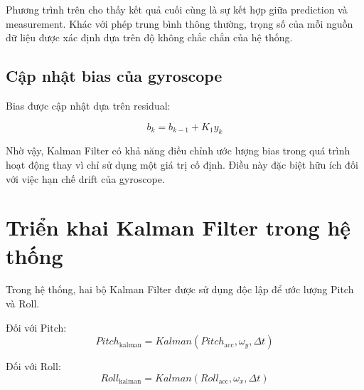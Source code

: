Phương trình trên cho thấy kết quả cuối cùng là sự kết hợp giữa prediction và measurement. Khác với phép trung bình thông thường, trọng số của mỗi nguồn dữ liệu được xác định dựa trên độ không chắc chắn của hệ thống.


\subsection{Cập nhật bias của gyroscope}

Bias được cập nhật dựa trên residual:

\begin{equation}
b_k
=
b_{k-1}
+
K_1y_k
\end{equation}

Nhờ vậy, Kalman Filter có khả năng điều chỉnh ước lượng bias trong quá trình hoạt động thay vì chỉ sử dụng một giá trị cố định. Điều này đặc biệt hữu ích đối với việc hạn chế drift của gyroscope.


\section{Triển khai Kalman Filter trong hệ thống}
\label{sec:kalman-implementation}

Trong hệ thống, hai bộ Kalman Filter được sử dụng độc lập để ước lượng Pitch và Roll.

Đối với Pitch:
\begin{equation}
Pitch_{\text{kalman}}
=
Kalman
\left(
Pitch_{\text{acc}},
\omega_y,
\Delta t
\right)
\end{equation}

Đối với Roll:
\begin{equation}
Roll_{\text{kalman}}
=
Kalman
\left(
Roll_{\text{acc}},
\omega_x,
\Delta t
\right)
\end{equation}

